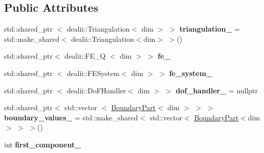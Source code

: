 \subsection*{\-Public \-Attributes}
\begin{DoxyCompactItemize}
\item 
\hypertarget{classSpacy_1_1dealII_1_1VectorCreator_afdff8fb5c5eaf08b1da5fad005e0a542}{std\-::shared\-\_\-ptr\*
$<$ dealii\-::\-Triangulation$<$ dim $>$ $>$ {\bfseries triangulation\-\_\-} = std\-::make\-\_\-shared$<$ dealii\-::\-Triangulation$<$dim$>$ $>$()}\label{classSpacy_1_1dealII_1_1VectorCreator_afdff8fb5c5eaf08b1da5fad005e0a542}

\item 
\hypertarget{classSpacy_1_1dealII_1_1VectorCreator_a9204f6360dc4c7d40502f7d3a0d58905}{std\-::shared\-\_\-ptr$<$ dealii\-::\-F\-E\-\_\-\-Q\*
$<$ dim $>$ $>$ {\bfseries fe\-\_\-}}\label{classSpacy_1_1dealII_1_1VectorCreator_a9204f6360dc4c7d40502f7d3a0d58905}

\item 
\hypertarget{classSpacy_1_1dealII_1_1VectorCreator_a9b37a1aaf90b0172552d65d1fa6f833c}{std\-::shared\-\_\-ptr\*
$<$ dealii\-::\-F\-E\-System$<$ dim $>$ $>$ {\bfseries fe\-\_\-system\-\_\-}}\label{classSpacy_1_1dealII_1_1VectorCreator_a9b37a1aaf90b0172552d65d1fa6f833c}

\item 
\hypertarget{classSpacy_1_1dealII_1_1VectorCreator_ac37ae0324517815460d797847bc68abd}{std\-::shared\-\_\-ptr\*
$<$ dealii\-::\-Do\-F\-Handler$<$ dim $>$ $>$ {\bfseries dof\-\_\-handler\-\_\-} = nullptr}\label{classSpacy_1_1dealII_1_1VectorCreator_ac37ae0324517815460d797847bc68abd}

\item 
\hypertarget{classSpacy_1_1dealII_1_1VectorCreator_ac2e6fcd47513c33808951303f2a90a17}{std\-::shared\-\_\-ptr$<$ std\-::vector\*
$<$ \hyperlink{structSpacy_1_1dealII_1_1BoundaryPart}{\-Boundary\-Part}$<$ dim $>$ $>$ $>$ {\bfseries boundary\-\_\-values\-\_\-} = std\-::make\-\_\-shared$<$ std\-::vector$<$ \hyperlink{structSpacy_1_1dealII_1_1BoundaryPart}{\-Boundary\-Part}$<$dim$>$ $>$ $>$()}\label{classSpacy_1_1dealII_1_1VectorCreator_ac2e6fcd47513c33808951303f2a90a17}

\item 
\hypertarget{classSpacy_1_1dealII_1_1VectorCreator_a90c4f30e4c855a1c1157f1f052e8e1d3}{int {\bfseries first\-\_\-component\-\_\-}}\label{classSpacy_1_1dealII_1_1VectorCreator_a90c4f30e4c855a1c1157f1f052e8e1d3}

\end{DoxyCompactItemize}


